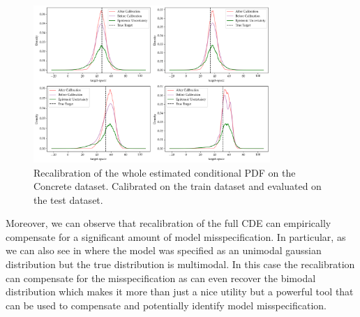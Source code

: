\begin{figure}
    \centering
    \includegraphics[width=0.8\textwidth]{resources/recalibration_concrete_dataset.png}
    \caption{Recalibration of the whole estimated conditional PDF on the Concrete dataset. Calibrated on the train dataset and evaluated on the test dataset.}
    \label{fig:recalibration_concrete}
\end{figure}

Moreover, we can observe that recalibration of the full CDE can empirically compensate for a significant amount of model misspecification. In particular, as we can also see in  where the model was specified as an unimodal gaussian distribution but the true distribution is multimodal. In this case the recalibration can compensate for the misspecification as can even recover the bimodal distribution which makes it more than just a nice utility but a powerful tool that can be used to compensate and potentially identify model misspecification.

